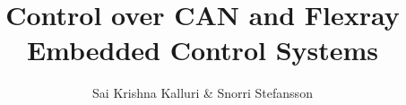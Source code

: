 \documentclass{report}
\begin{document}
\title{ {\fontsize{16}{1} \selectfont Control over CAN and Flexray} {\\ \fontsize{13}{1} \selectfont \textbf{Embedded Control Systems}} }
\author{Sai Krishna Kalluri \& Snorri Stefansson }

\maketitle

\tableofcontents











\printbibliography
\end{document}
